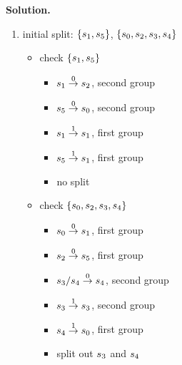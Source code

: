 \textbf{Solution.}
\renewcommand{\labelitemii}{\ding{226}}
\begin{enumerate}
\item initial split: \(\{s_{1},s_{5}\}\), \(\{s_{0}, s_{2}, s_{3}, s_{4}\}\)
  \begin{itemize}
    \item check \(\{s_{1},s_{5}\}\)
      \begin{itemize}
      \item \(s_{1} \overset{0}{\rightarrow} s_{2}\), second group
      \item \(s_{5} \overset{0}{\rightarrow} s_{0}\), second group
      \item \(s_{1} \overset{1}{\rightarrow} s_{1}\), first group
      \item \(s_{5} \overset{1}{\rightarrow} s_{1}\), first group
      \item[] no split
    \end{itemize}

    \item check \(\{s_{0}, s_{2}, s_{3}, s_{4}\}\)
      \begin{itemize}
      \item \(s_{0} \overset{0}{\rightarrow} s_{1}\), first group
      \item \(s_{2} \overset{0}{\rightarrow} s_{5}\), first group
      \item \(s_{3}/s_{4} \overset{0}{\rightarrow} s_{4}\), second group
      \item \(s_{3} \overset{1}{\rightarrow} s_{3}\), second group
      \item \(s_{4} \overset{1}{\rightarrow} s_{0}\), first group
      \item[] split out \(s_{3}\) and \(s_{4}\)
    \end{itemize}
\end{itemize}


\end{enumerate}
